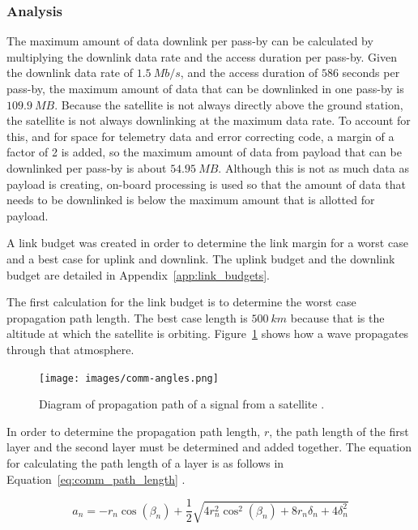 \documentclass[12pt]{article}
\begin{document}
			\subsubsection{Analysis}

The maximum amount of data downlink per pass-by can be calculated by multiplying the downlink data rate and the access duration per pass-by. Given the downlink data rate of $1.5\ Mb/s$, and the access duration of $586$ seconds per pass-by, the maximum amount of data that can be downlinked in one pass-by is $109.9\ MB$. Because the satellite is not always directly above the ground station, the satellite is not always downlinking at the maximum data rate. To account for this, and for space for telemetry data and error correcting code, a margin of a factor of 2 is added, so the maximum amount of data from payload that can be downlinked per pass-by is about $54.95\ MB$. Although this is not as much data as payload is creating, on-board processing is used so that the amount of data that needs to be downlinked is below the maximum amount that is allotted for payload.

A link budget was created in order to determine the link margin for a worst case and a best case for uplink and downlink. The uplink budget and the downlink budget are detailed in Appendix~\ref{app:link_budgets}.

The first calculation for the link budget is to determine the worst case propagation path length. The best case length is $500\ km$ because that is the altitude at which the satellite is orbiting. Figure~\ref{fig:comm_propagation_path} shows how a wave propagates through that atmosphere.

\begin{figure}[ht]
\centering
  \texttt{[image: images/comm-angles.png]}
\caption{Diagram of propagation path of a signal from a satellite \cite[p.~12]{ITU-R}.}
\label{fig:comm_propagation_path}
\end{figure}

In order to determine the propagation path length, $r$, the path length of the first layer and the second layer must be determined and added together. The equation for calculating the path length of a layer is as follows in Equation~\ref{eq:comm_path_length} \cite[p.~9]{ITU-R}.

\begin{equation}\label{eq:comm_path_length}
a_n = -r_n\cos(\beta_n) + \frac{1}{2}\sqrt{4r_n^2\cos^2(\beta_n)+8r_n\delta_n+4\delta_n^2} 
\end{equation}
\end{document}
